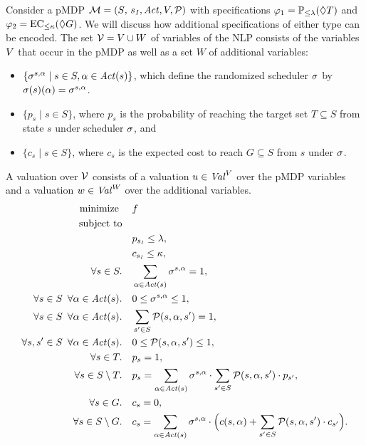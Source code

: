 Consider a
pMDP $\mathcal{M}{}=(S{},\,s_{\mathit{I}}{},\mathit{Act},{V},\mathcal{P}{})$ with specifications $\varphi_1=\mathbb{P}_{\leq \lambda}(\lozenge T)$ and $\varphi_2=\mathrm{EC}_{\leq \kappa}(\lozenge G)$. We will discuss how additional specifications of either type can be encoded.
The set $\mathcal{V} = {V} \cup W$ of variables of the NLP consists of
the variables ${V}$ that occur in the pMDP as well as a set $W$ of additional variables:
\begin{itemize}
	\item $\{ \sigma^{s,\alpha} \mid s \in S, \alpha\in\mathit{Act}(s) \}$,
		which define the randomized scheduler $\sigma$ by $\sigma(s)(\alpha)=\sigma^{s,\alpha}$.
	\item $\{ p_s \mid s \in S \}$, 
		where $p_s$ is the probability of reaching the target set 
		$T\subseteq S$ from state $s$ under scheduler $\sigma$, and
	\item $\{ c_s \mid s \in S \}$, where $c_s$ is the expected cost to reach $G\subseteq S$ from $s$ under $\sigma$.
\end{itemize}
 A valuation over $\mathcal{V}$ consists of a valuation $u\in\mathit{Val}^V$ over the
pMDP variables and a valuation $w\in\mathit{Val}^W$ over the additional variables.
\begin{align}
	\mbox{minimize } &\quad f \label{eq:min_rand}\\
	\mbox{subject to}\notag \\
					 &\quad p_{s_{\mathit{I}}}\leq \lambda,				\label{eq:lambda}\\
					 &\quad c_{s_{\mathit{I}}}\leq \kappa,				\label{eq:kappa}\\
	\forall s\in S.	&\quad \sum_{\alpha\in\mathit{Act}(s)}\sigma^{s,\alpha}=1, \label{eq:well-defined_sched_rand}\\
	\forall s\in S\,~\forall\alpha\in\mathit{Act}(s). &\quad 0 \leq \sigma^{s,\alpha} \leq 1,				\label{eq:sched_is_dist}\\
	\forall s\in S\,~\forall\alpha\in\mathit{Act}(s).	 &\quad \sum_{s'\in S}\mathcal{P}(s,\alpha,s')=1,	\label{eq:well-defined_probs_rand}\\
	\forall s, s'\in S\,~\forall\alpha\in\mathit{Act}(s).	 &\quad 0 \leq \mathcal{P}(s,\alpha,s') \leq 1,	\label{eq:probs_is_prob}\\
	\forall s\in T.	&\quad p_s=1,															\label{eq:targetprob_rand}\\
	\forall s\in S\setminus T. &\quad p_s=\sum_{\alpha\in\mathit{Act}(s)}\sigma^{s,\alpha}\cdot\sum_{s'\in S}	\mathcal{P}(s,\alpha,s')\cdot p_{s'}, \label{eq:probcomputation_rand}\\
	\forall s\in G.	 &\quad c_s=0,															\label{eq:targetrew}\\
	\forall s\in S\setminus G.	&\quad c_s= \sum_{\alpha\in\mathit{Act}(s)} \sigma^{s,\alpha} \cdot \Bigl(c(s,\alpha) + \sum_{s'\in S}	\mathcal{P} (s,\alpha,s') \cdot c_{s'}\Bigr). \label{eq:rewcomputation}
\end{align}%
